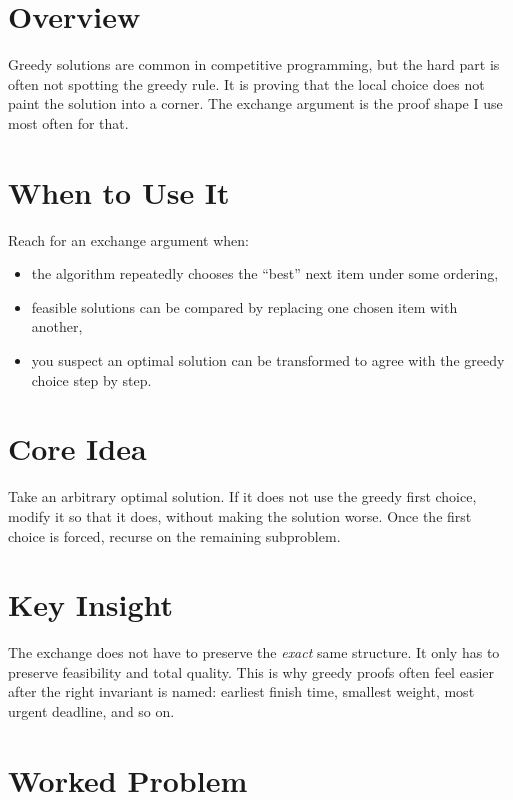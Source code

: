 \section*{Overview}

Greedy solutions are common in competitive programming, but the hard part is often not spotting the greedy rule. It is
proving that the local choice does not paint the solution into a corner. The exchange argument is the proof shape I use
most often for that.

\section*{When to Use It}

Reach for an exchange argument when:

\begin{itemize}
  \item the algorithm repeatedly chooses the ``best'' next item under some ordering,
  \item feasible solutions can be compared by replacing one chosen item with another,
  \item you suspect an optimal solution can be transformed to agree with the greedy choice step by step.
\end{itemize}

\section*{Core Idea}

Take an arbitrary optimal solution. If it does not use the greedy first choice, modify it so that it does, without
making the solution worse. Once the first choice is forced, recurse on the remaining subproblem.

\section*{Key Insight}

The exchange does not have to preserve the \emph{exact} same structure. It only has to preserve feasibility and total
quality. This is why greedy proofs often feel easier after the right invariant is named: earliest finish time,
smallest weight, most urgent deadline, and so on.

\section*{Worked Problem}

